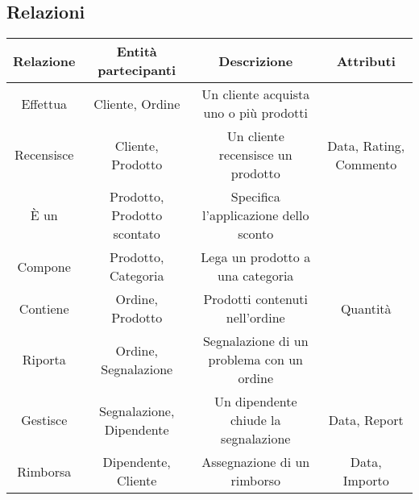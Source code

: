 \subsection{Relazioni}
\begin{center}
\begin{tabular}{ |c|c|c|c|} 
\hline
Relazione & Entità partecipanti & Descrizione & Attributi \\
\hline
\multirow{3}{6em}{Effettua} & \multirow{3}{12em}{Cliente, Ordine} & \multirow{3}{8em}{Un cliente acquista uno o più prodotti} & \multirow{3}{12em}{} \\
 &  &  & \\
 &  &  & \\
\hline

\multirow{3}{6em}{Recensisce} & \multirow{3}{12em}{Cliente, Prodotto} & \multirow{3}{8em}{Un cliente recensisce un prodotto} & \multirow{3}{12em}{Data, Rating, Commento} \\
 &  &  & \\
 &  &  & \\
\hline

\multirow{3}{6em}{È un} & \multirow{3}{12em}{Prodotto, Prodotto scontato} & \multirow{3}{8em}{Specifica l'applicazione dello sconto} & \multirow{3}{12em}{} \\
 &  &  & \\
 &  &  & \\
\hline

\multirow{3}{6em}{Compone} & \multirow{3}{12em}{Prodotto, Categoria} & \multirow{3}{8em}{Lega un prodotto a una categoria} & \multirow{3}{12em}{} \\
 &  &  & \\
 &  &  & \\ 
\hline

\multirow{3}{6em}{Contiene} & \multirow{3}{12em}{Ordine, Prodotto} & \multirow{3}{8em}{Prodotti contenuti nell'ordine} & \multirow{3}{12em}{Quantità} \\
 &  &  & \\
 &  &  & \\
\hline

\multirow{3}{6em}{Riporta} & \multirow{3}{12em}{Ordine, Segnalazione} & \multirow{3}{8em}{Segnalazione di un problema con un ordine} & \multirow{3}{12em}{} \\
 &  &  & \\
 &  &  & \\
\hline

\multirow{3}{6em}{Gestisce} & \multirow{3}{12em}{Segnalazione, Dipendente} & \multirow{3}{8em}{Un dipendente chiude la segnalazione} & \multirow{3}{12em}{Data, Report} \\
&  &  & \\
&  &  & \\ 
\hline

\multirow{3}{6em}{Rimborsa} & \multirow{3}{12em}{Dipendente, Cliente} & \multirow{3}{8em}{Assegnazione di un rimborso} & \multirow{3}{12em}{Data, Importo} \\
&  &  & \\
&  &  & \\ 
\hline
\end{tabular}
\end{center}